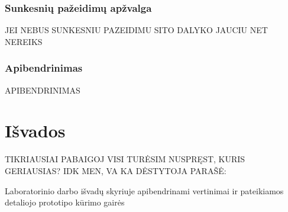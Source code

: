 \documentclass{VUMIFPSkursinis}
\begin{document}
\subsubsection{Sunkesnių pažeidimų apžvalga}
JEI NEBUS SUNKESNIU PAZEIDIMU SITO DALYKO JAUCIU NET NEREIKS

\subsubsection{Apibendrinimas}
APIBENDRINIMAS


\section{Išvados}
TIKRIAUSIAI PABAIGOJ VISI TURĖSIM NUSPRĘST, KURIS GERIAUSIAS? IDK MEN, VA KA DĖSTYTOJA PARAŠĖ:

Laboratorinio darbo išvadų skyriuje apibendrinami vertinimai ir pateikiamos detaliojo prototipo kūrimo gairės


















\printbibliography[heading=bibintoc, title=Šaltiniai]  %
\end{document}
